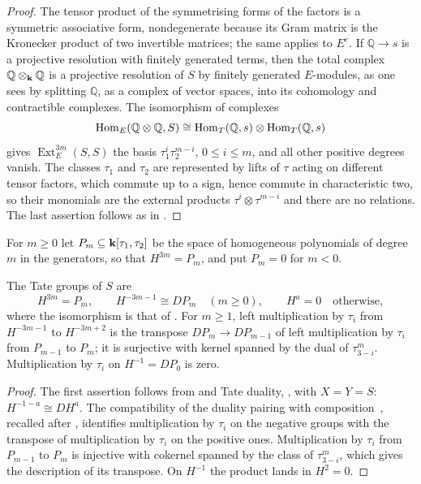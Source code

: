 \begin{proof}
  The tensor product of the symmetrising forms of the factors is a symmetric
  associative form, nondegenerate because its Gram matrix is the Kronecker
  product of two invertible matrices; the same applies to $E^e$. If
  ${\mathbb{Q}\to s}$ is a projective resolution with finitely generated terms,
  then the total complex ${\mathbb{Q}\otimes_{\mathbf{k}}\mathbb{Q}}$ is a projective
  resolution of $S$ by finitely generated $E$-modules, as one sees by
  splitting $\mathbb{Q}$, as a complex of vector spaces, into its cohomology
  and contractible complexes. The isomorphism of complexes
  \[
    \Hom[E]{\mathbb{Q}\otimes\mathbb{Q}}{S}\cong\Hom[T]{\mathbb{Q}}{s}\otimes
    \Hom[T]{\mathbb{Q}}{s}
  \]
  gives $\operatorname{Ext}^{3m}_E(S,S)$ the basis
  $\tau_1^i\tau_2^{m-i}$, ${0\leq i\leq m}$, and all other positive degrees
  vanish. The classes $\tau_1$ and $\tau_2$ are represented by lifts of $\tau$
  acting on different tensor factors, which commute up to a sign, hence
  commute in characteristic two, so
  their monomials are the external products ${\tau^i\otimes\tau^{m-i}}$ and
  there are no relations. The last assertion follows as in .
\end{proof}

For ${m\geq0}$ let ${P_m\subseteq\mathbf{k}[\tau_1,\tau_2]}$ be the space of homogeneous
polynomials of degree $m$ in the generators, so that ${H^{3m}=P_m}$, and put
${P_m=0}$ for ${m<0}$.

\begin{proposition}
  \label{prop:E-tate}
  The Tate groups of $S$ are
  \[
    H^{3m}=P_m,\qquad H^{-3m-1}\cong DP_m\quad(m\geq0),\qquad
    H^a=0\quad\text{otherwise},
  \]
  where the isomorphism is that of . For ${m\geq1}$, left
  multiplication by $\tau_i$ from $H^{-3m-1}$ to $H^{-3m+2}$ is
  the transpose ${DP_m}\to{ DP_{m-1}}$ of left multiplication by $\tau_i$ from
  $P_{m-1}$ to $P_m$; it is surjective with kernel spanned by the dual of
  $\tau_{3-i}^m$. Multiplication by $\tau_i$ on ${H^{-1}=DP_0}$ is zero.
\end{proposition}

\begin{proof}
  The first assertion follows from  and Tate duality,
  , with ${X=Y=S}$: ${H^{-1-a}\cong DH^a}$. The
  compatibility of the duality pairing with composition~\cite[Section~2,
  (2.8)]{Lin13}, recalled after , identifies
  multiplication by $\tau_i$ on the negative groups with the transpose of
  multiplication by $\tau_i$ on the positive ones. Multiplication by $\tau_i$
  from $P_{m-1}$ to $P_m$ is injective with cokernel spanned by the class of
  $\tau_{3-i}^m$, which gives the description of its transpose. On $H^{-1}$
  the product lands in ${H^2=0}$.
\end{proof}

